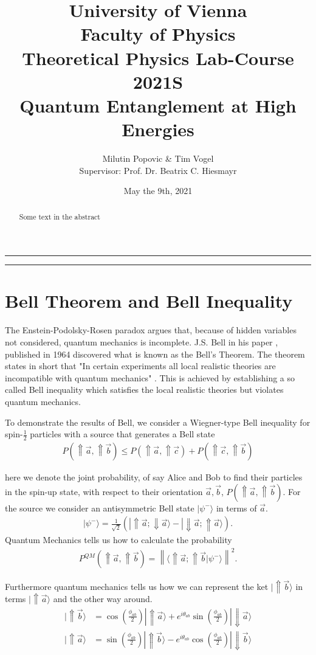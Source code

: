 \documentclass[a4paper]{article}
\title{University of Vienna\\ Faculty of Physics\\ \vspace{1.25cm} Theoretical Physics Lab-Course 2021S\\
Quantum Entanglement at High Energies}
\author{Milutin Popovic \& Tim Vogel \vspace{1cm}\\ Supervisor: Prof. Dr. Beatrix C.
Hiesmayr}
\date{May the 9th, 2021}
\begin{document}
\maketitle
\noindent\rule[0.5ex]{\linewidth}{1pt}
\begin{abstract}
Some text in the abstract
\end{abstract}
\noindent\rule[0.5ex]{\linewidth}{1pt}

\tableofcontents

\section{Bell Theorem and Bell Inequality}
The Enstein-Podolsky-Rosen paradox argues that, because of hidden variables
not considered, quantum mechanics is incomplete. J.S. Bell in his paper \cite{bell},
published in 1964 discovered what is known as the Bell's Theorem. The theorem
states in short that "In certain experiments all local realistic theories are
incompatible with quantum mechanics" \cite{bell}. This is achieved by
establishing a so called Bell inequality which satisfies the local realistic
theories but violates quantum mechanics.

To demonstrate the results of Bell, we consider a Wiegner-type Bell inequality
for spin-$\frac{1}{2}$ particles with a source that generates a Bell state
\begin{align}\label{eq:wtb}
    P(\Uparrow \vec{a}, \Uparrow \vec{b}) \leq
    P(\Uparrow \vec{a}, \Uparrow \vec{c}) + P(\Uparrow \vec{c}, \Uparrow \vec{b})
\end{align}

here we denote the joint probability, of say Alice and Bob to find their
particles in the spin-up state, with respect to their orientation $\vec{a},
\vec{b}$, $P(\Uparrow \vec{a}, \Uparrow \vec{b})$. For the source we consider
an antisymmetric Bell state $|\psi ^-\rangle$ in terms of $\vec{a}$.
\begin{align}
    |\psi ^-\rangle = \frac{1}{\sqrt{2}}(|\Uparrow \vec{a}; \Downarrow
    \vec{a}\rangle - |\Downarrow \vec{a}; \Uparrow \vec{a}\rangle).
\end{align}
Quantum Mechanics tells us how to calculate the probability
\begin{align}\label{eq:prob}
    P^{QM}(\Uparrow \vec{a}, \Uparrow \vec{b}) = \left\|\langle\Uparrow \vec{a}; \Uparrow
    \vec{b}|\psi ^-\rangle \right\|^2.
\end{align}

Furthermore quantum mechanics tells us how we can represent the ket
$|\Uparrow \vec{b}\rangle$ in terms $|\Uparrow \vec{a}\rangle$ and the other
way around.
\begin{align}
    |\Uparrow \vec{b}\rangle &= \cos(\frac{\phi_{ab}}{2})|\Uparrow
    \vec{a}\rangle + e^{i\theta_{ab}} \sin(\frac{\phi_{ab}}{2})|\Downarrow
    \vec{a}\rangle\\
    |\Uparrow \vec{a}\rangle &= \sin(\frac{\phi_{ab}}{2})|\Uparrow
    \vec{b}\rangle - e^{i\theta_{ab}} \cos(\frac{\phi_{ab}}{2})|\Downarrow
    \vec{b}\rangle
\end{align}
\end{document}
